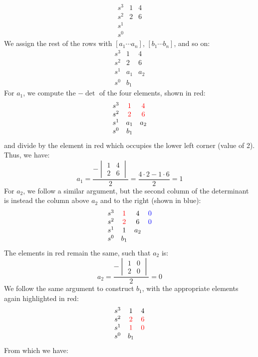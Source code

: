 $$
\begin{array}{lcc}
     s^3& 1 &4\\
     s^2& 2&6\\
     s^1& \\
     s^0
\end{array}
$$
We assign the rest of the rows with $[a_1\cdots a_n]$, $[b_1\cdots b_n]$, and so on:
$$
\begin{array}{lcc}
     s^3& 1 &4\\
     s^2& 2&6\\
     s^1&a_1&a_2 \\
     s^0&b_1
\end{array}
$$
For $a_1$, we compute the $-\det$ of the four elements, shown in red:
$$
\begin{array}{lcc}
     s^3& \color{red}1 &\color{red}4\\
     s^2& \color{red}2&\color{red}6\\
     s^1&a_1&a_2 \\
     s^0&b_1
\end{array}
$$
and divide by the element in red which occupies the lower left corner (value of 2). Thus, we have:
$$a_1=\frac{-\begin{vmatrix}1&4\\2&6
\end{vmatrix}}{2}=\frac{4\cdot2-1\cdot6}{2}=1$$
For $a_2$, we follow a similar argument, but the second column of the determinant is instead the column above $a_2$ and to the right (shown in blue):
$$
\begin{array}{lccc}
     s^3& \color{red}1 &4&\color{blue}0\\
     s^2& \color{red}2&6&\color{blue}0\\
     s^1&1&a_2 \\
     s^0&b_1
\end{array}
$$
The elements in red remain the same, such that $a_2$ is:
$$a_2=\frac{-\begin{vmatrix}1&0\\2&0
\end{vmatrix}}{2}=0$$
We follow the same argument to construct $b_1$, with the appropriate elements again highlighted in red:
$$
\begin{array}{lcc}
     s^3& 1 &4\\
     s^2& \color{red}2&\color{red}6\\
     s^1&\color{red}1&\color{red}0 \\
     s^0&b_1
\end{array}
$$
From which we have:
